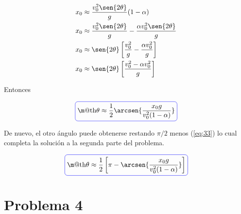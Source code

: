 \documentclass[a4paper,10pt]{article}
\makeatletter
\numberwithin{equation}{section}
\newcommand*{\boxcolor}{blue}
\renewcommand{\boxed}[1]{\textcolor{\boxcolor}{%
\tikz[baseline={([yshift=-1ex]current bounding box.center)}] \node [rectangle, minimum width=1ex,rounded corners,draw] {\normalcolor\m@th$\displaystyle#1$};}}
\makeatother
\begin{document}
% 
% 
% 
% 

\begin{align*}
 x_0 &\approx \frac{v_0^2 \sen{2\theta}}{g}(1 - \alpha) \\
%
 x_0 &\approx  \frac{v_0^2 \sen{2\theta}}{g} -  \frac{\alpha v_0^2 \sen{2\theta}}{g} \\
%
 x_0 &\approx \sen{2\theta} \left[ \frac{v_0^2}{g} - \frac{\alpha v_0^2}{g}\right] \\
 x_0 &\approx \sen{2\theta} \left[ \frac{v_0^2 - \alpha v_0^2}{g}\right]
\end{align*}

Entonces 

\begin{equation}
 \boxed{\theta \approx \frac{1}{2} \arcsen{\frac{x_0 g}{v_0^2(1-\alpha)}}}
 \label{eq:33}
\end{equation}

De nuevo, el otro ángulo puede obtenerse restando $\pi/2$ menos (\ref{eq:33}) lo 
cual completa la solución a la segunda parte del problema.

\begin{equation}
 \boxed{\theta \approx \frac{1}{2}\left[\pi - \arcsen{\frac{x_0 g}{v_0^2(1-\alpha)}} \right]}
\end{equation}
























\vspace{.3cm}

\section{Problema 4}
\end{document}

